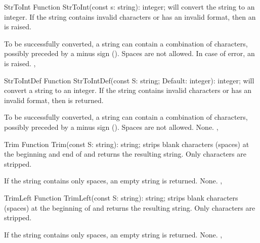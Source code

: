 

\begin{function}{StrToInt}
\Declaration
Function StrToInt(const s: string): integer;
\Description
{} will convert the string to an integer.
If the string contains invalid characters or has an invalid format,
then an  is raised.

To be successfully converted, a string can contain a combination
of  characters, possibly preceded by a minus sign (\var{-}).
Spaces are not allowed.
\Errors
In case of error, an  is raised.
\SeeAlso
{}, 
\end{function}



\begin{function}{StrToIntDef}
\Declaration
Function StrToIntDef(const S: string; Default: integer): integer;
\Description
{} will convert a string to an integer. If the string contains
invalid characters or has an invalid format, then  is returned.

To be successfully converted, a string can contain a combination of
 characters, possibly preceded by a minus sign (\var{-}).
Spaces are not allowed.
\Errors
None.
\SeeAlso
{}, 
\end{function}



\begin{function}{Trim}
\Declaration
Function Trim(const S: string): string;
\Description
{} strips blank characters (spaces) at the beginning and end of 
and returns the resulting string. Only  characters are stripped.

If the string contains only spaces, an empty string is returned.
\Errors
None.
\SeeAlso
{}, 
\end{function}



\begin{function}{TrimLeft}
\Declaration
Function TrimLeft(const S: string): string;
\Description
{} strips blank characters (spaces) at the beginning of 
and returns the resulting string. Only  characters are stripped.

If the string contains only spaces, an empty string is returned.
\Errors
None.
\SeeAlso
{}, 
\end{function}

